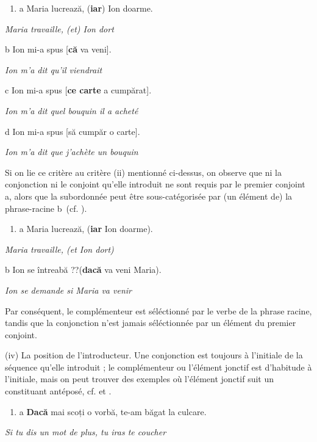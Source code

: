 \begin{enumerate}
\item \label{bkm:Ref300184862}a  Maria lucrează, (\textbf{iar}) Ion doarme.


\end{enumerate}
{\itshape
Maria travaille, (et) Ion dort}

  b  Ion mi-a spus [\textbf{că} va veni].

    \textit{Ion m'a dit qu'il viendrait}

  c  Ion mi-a spus [\textbf{ce carte} a cumpărat].

{\itshape
    Ion m'a dit quel bouquin il a acheté}

  d  Ion mi-a spus [să cumpăr o carte].

\textit{    Ion m'a dit que j'achète un bouquin} 

Si on lie ce critère au critère (ii) mentionné ci-dessus, on observe que ni la conjonction ni le conjoint qu'elle introduit ne sont requis par le premier conjoint a, alors que la subordonnée peut être sous-catégorisée par (un élément de) la phrase-racine b~(cf. \citet{Johannessen1998}).


\begin{enumerate}
\item \label{bkm:Ref300185582}a  Maria lucrează, (\textbf{iar} Ion doarme). 


\end{enumerate}
\textit{Maria travaille, (et Ion dort)}   

  b  Ion se întreabă ??(\textbf{dacă} va veni Maria).

    \textit{Ion se demande si Maria va venir}

Par conséquent, le complémenteur est séléctionné par le verbe de la phrase racine, tandis que la conjonction n'est jamais séléctionnée par un élément du premier conjoint.

(iv) La position de l'introducteur. Une conjonction est toujours à l'initiale de la séquence qu'elle introduit ; le complémenteur ou l'élément jonctif est d'habitude à l'initiale, mais on peut trouver des exemples où l'élément jonctif suit un constituant antéposé, cf.  et .


\begin{enumerate}
\item \label{bkm:Ref300186399}a  \textbf{Dacă} mai scoți o vorbă, te-am băgat la culcare.


\end{enumerate}
{\itshape
Si tu dis un mot de plus, tu iras te coucher}

